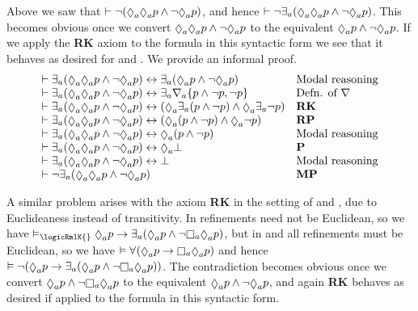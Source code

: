 Above we saw that $\proves \lnot (\possibleA \possibleA \atomP \land \lnot \possibleA \atomP)$, and hence $\proves \lnot \somerefsA (\possibleA \possibleA \atomP \land \lnot \possibleA \atomP)$.
This becomes obvious once we convert $\possibleA \possibleA \atomP \land \lnot \possibleA \atomP$ to the equivalent $\possibleA \atomP \land \lnot \possibleA \atomP$.
If we apply the {\bf RK} axiom to the formula in this syntactic form we see that it behaves as desired for \logicRmlKFF{} and \logicRmlKD{}.
We provide an informal proof.
$$
\begin{array}{ll}
    \proves \somerefsA (\possibleA \possibleA \atomP \land \lnot \possibleA \atomP) \iff \somerefsA (\possibleA \atomP \land \lnot \possibleA \atomP) & \text{Modal reasoning}\\
    \proves \somerefsA (\possibleA \possibleA \atomP \land \lnot \possibleA \atomP) \iff \somerefsA \coversA \{\atomP \land \lnot \atomP, \lnot \atomP\} & \text{Defn. of $\covers$}\\
    \proves \somerefsA (\possibleA \possibleA \atomP \land \lnot \possibleA \atomP) \iff (\possibleA \somerefsA (\atomP \land \lnot \atomP) \land \possibleA \somerefsA \lnot \atomP) & {\bf RK}\\ 
    \proves \somerefsA (\possibleA \possibleA \atomP \land \lnot \possibleA \atomP) \iff (\possibleA (\atomP \land \lnot \atomP) \land \possibleA \lnot \atomP) & {\bf RP}\\ 
    \proves \somerefsA (\possibleA \possibleA \atomP \land \lnot \possibleA \atomP) \iff \possibleA (\atomP \land \lnot \atomP) & \text{Modal reasoning}\\ 
    \proves \somerefsA (\possibleA \possibleA \atomP \land \lnot \possibleA \atomP) \iff \possibleA \bot & {\bf P}\\ 
    \proves \somerefsA (\possibleA \possibleA \atomP \land \lnot \possibleA \atomP) \iff \bot & \text{Modal reasoning}\\ 
    \proves \lnot \somerefsA (\possibleA \possibleA \atomP \land \lnot \possibleA \atomP) & {\bf MP}\\ 
\end{array}
$$

A similar problem arises with the axiom {\bf RK} in the setting of \logicRmlKFF{} and \logicRmlKD{}, due to Euclideaness instead of transitivity.
In \logicRmlK{} refinements need not be Euclidean, so we have $\entails_\logicRmlK{} \possibleA \atomP \implies \somerefsA (\possibleA \atomP \land \lnot \necessaryA \possibleA \atomP)$, but in \logicRmlKFF{} and \logicRmlKD{} all refinements must be Euclidean, so we have $\entails \allrefs (\possibleA \atomP \implies \necessaryA \possibleA \atomP)$ and hence $\entails \lnot (\possibleA \atomP \implies \somerefsA (\possibleA \atomP \land \lnot \necessaryA \possibleA \atomP))$.
The contradiction becomes obvious once we convert $\possibleA \atomP \land \lnot \necessaryA \possibleA \atomP$ to the equivalent $\possibleA \atomP \land \lnot \possibleA \atomP$, and again {\bf RK} behaves as desired if applied to the formula in this syntactic form.

